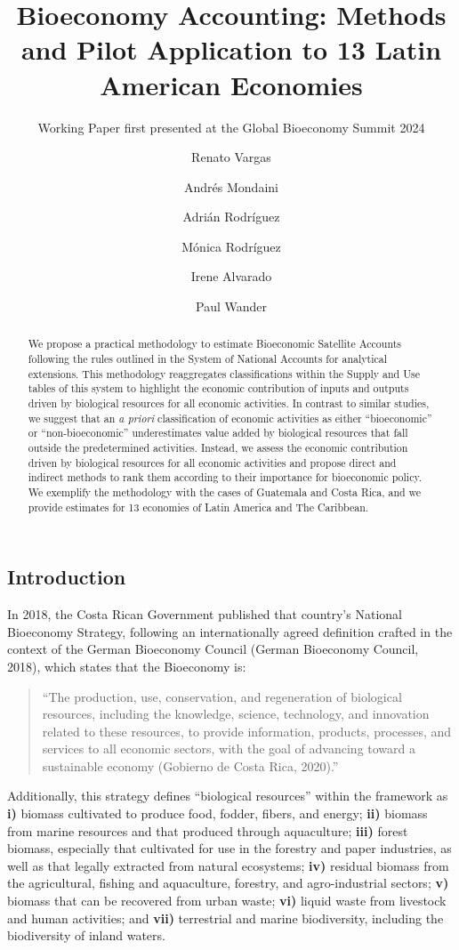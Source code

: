 \documentclass[
  letterpaper,
  DIV=11,
  numbers=noendperiod]{scrartcl}
\title{Bioeconomy Accounting: Methods and Pilot Application to 13 Latin
American Economies}
\subtitle{Working Paper first presented at the Global Bioeconomy Summit
2024}
\author{Renato Vargas \and Andrés Mondaini \and Adrián
Rodríguez \and Mónica Rodríguez \and Irene Alvarado \and Paul Wander}
\date{}
\begin{document}
\maketitle
\begin{abstract}
We propose a practical methodology to estimate Bioeconomic Satellite
Accounts following the rules outlined in the System of National Accounts
for analytical extensions. This methodology reaggregates classifications
within the Supply and Use tables of this system to highlight the
economic contribution of inputs and outputs driven by biological
resources for all economic activities. In contrast to similar studies,
we suggest that an \emph{a priori} classification of economic activities
as either ``bioeconomic'' or ``non-bioeconomic'' underestimates value
added by biological resources that fall outside the predetermined
activities. Instead, we assess the economic contribution driven by
biological resources for all economic activities and propose direct and
indirect methods to rank them according to their importance for
bioeconomic policy. We exemplify the methodology with the cases of
Guatemala and Costa Rica, and we provide estimates for 13 economies of
Latin America and The Caribbean.
\end{abstract}

\subsection{Introduction}\label{introduction}

In 2018, the Costa Rican Government published that country's National
Bioeconomy Strategy, following an internationally agreed definition
crafted in the context of the German Bioeconomy Council (German
Bioeconomy Council, 2018), which states that the Bioeconomy is:

\begin{quote}
``The production, use, conservation, and regeneration of biological
resources, including the knowledge, science, technology, and innovation
related to these resources, to provide information, products, processes,
and services to all economic sectors, with the goal of advancing toward
a sustainable economy (Gobierno de Costa Rica, 2020).''
\end{quote}

Additionally, this strategy defines ``biological resources'' within the
framework as \textbf{i)} biomass cultivated to produce food, fodder,
fibers, and energy; \textbf{ii)} biomass from marine resources and that
produced through aquaculture; \textbf{iii)} forest biomass, especially
that cultivated for use in the forestry and paper industries, as well as
that legally extracted from natural ecosystems; \textbf{iv)} residual
biomass from the agricultural, fishing and aquaculture, forestry, and
agro-industrial sectors; \textbf{v)} biomass that can be recovered from
urban waste; \textbf{vi)} liquid waste from livestock and human
activities; and \textbf{vii)} terrestrial and marine biodiversity,
including the biodiversity of inland waters.
\end{document}
